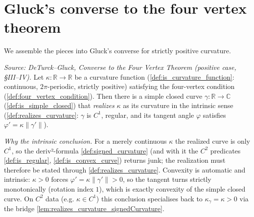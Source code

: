 \chapter{Gluck's converse to the four vertex theorem}
\label{chap:fourvertex}


We assemble the pieces into Gluck's converse for strictly positive curvature.

\begin{theorem}
  \label{thm:gluck_converse}
  \leanok
  \textit{Source: DeTurck--Gluck, Converse to the Four Vertex Theorem (positive case, §III–IV).}
  Let $\kappa : \mathbb{R} \to \mathbb{R}$ be a curvature function
  (\cref{def:is_curvature_function}: continuous, $2\pi$-periodic, strictly
  positive) satisfying the four-vertex condition
  (\cref{def:four_vertex_condition}). Then there is a simple closed curve
  $\gamma : \mathbb{R} \to \mathbb{C}$ (\cref{def:is_simple_closed}) that
  \emph{realizes} $\kappa$ as its curvature in the intrinsic sense
  (\cref{def:realizes_curvature}: $\gamma$ is $C^1$, regular, and its tangent
  angle $\varphi$ satisfies $\varphi' = \kappa\lVert\gamma'\rVert$).

  \emph{Why the intrinsic conclusion.} For a merely continuous $\kappa$ the
  realized curve is only $C^1$, so the deriv²-formula \cref{def:signed_curvature}
  (and with it the $C^2$ predicates \cref{def:is_regular},
  \cref{def:is_convex_curve}) returns junk; the realization must therefore be
  stated through \cref{def:realizes_curvature}. Convexity is automatic and
  intrinsic: $\kappa > 0$ forces $\varphi' = \kappa\lVert\gamma'\rVert > 0$, so
  the tangent turns strictly monotonically (rotation index $1$), which is exactly
  convexity of the simple closed curve. On $C^2$ data (e.g. $\kappa \in C^1$)
  this conclusion specialises back to $\kappa_\gamma = \kappa > 0$ via the bridge
  \cref{lem:realizes_curvature_signedCurvature}.
\end{theorem}

